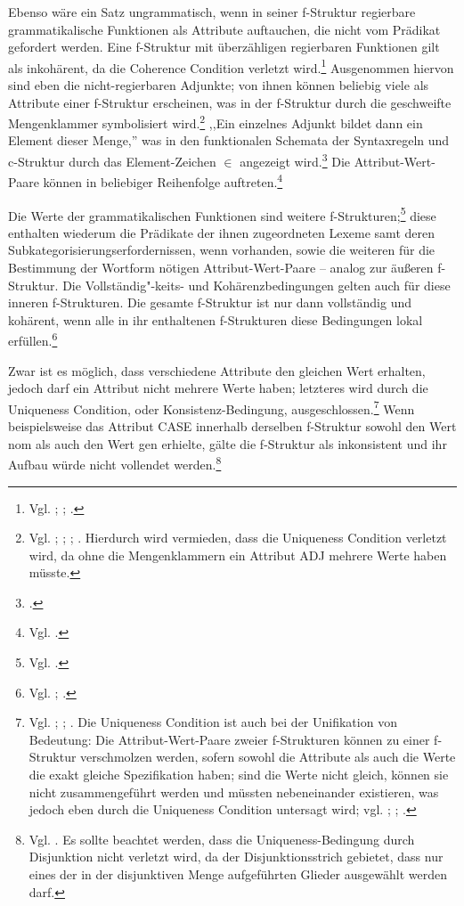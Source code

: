 \documentclass[12pt,a4paper]{article}
\begin{document}
Ebenso wäre ein Satz ungrammatisch, wenn in seiner f-Struktur regierbare grammatikalische Funktionen als Attribute auftauchen, die nicht vom Prädikat gefordert werden. Eine f-Struktur mit überzähligen regierbaren Funktionen gilt als inkohärent, da die Coherence Condition verletzt wird.\footnote{Vgl. \cite[59-62]{Falk}; \cite[29; 39]{Rohrer}; \cite[20]{Skript}.} Ausgenommen hiervon sind eben die nicht-regierbaren Adjunkte; von ihnen können beliebig viele als Attribute einer f-Struktur erscheinen, was in der f-Struktur durch die geschweifte Mengenklammer symbolisiert wird.\footnote{Vgl. \cite[61; 72]{Falk}; \cite[12]{Dal}; \cite[28]{Rohrer}; \cite[38-40]{Skript}. Hierdurch wird vermieden, dass die Uniqueness Condition verletzt wird, da ohne die Mengenklammern ein Attribut ADJ mehrere Werte haben müsste.} ,,Ein einzelnes Adjunkt bildet dann ein Element dieser Menge,'' was in den funktionalen Schemata der Syntaxregeln und c-Struktur durch das Element-Zeichen $\in$ angezeigt wird.\footnote{ \cite[39]{Skript}.} Die Attribut-Wert-Paare können in beliebiger Reihenfolge auftreten.\footnote{Vgl. \cite[35]{Rohrer}.}

Die Werte der grammatikalischen Funktionen sind weitere f-Strukturen;\footnote{Vgl. \cite[35]{Rohrer}.} diese enthalten wiederum die Prädikate der ihnen zugeordneten Lexeme samt deren Subkategorisierungserfordernissen, wenn vorhanden, sowie die weiteren für die Bestimmung der Wortform nötigen Attribut-Wert-Paare -- analog zur äußeren f-Struktur. Die Vollständig"-keits- und Kohärenzbedingungen gelten auch für diese inneren f-Strukturen. Die gesamte f-Struktur ist nur dann vollständig und kohärent, wenn alle in ihr enthaltenen f-Strukturen diese Bedingungen lokal erfüllen.\footnote{Vgl. \cite[60]{Falk}; \cite[19-21]{Skript}.}

Zwar ist es möglich, dass verschiedene Attribute den gleichen Wert erhalten, jedoch darf ein Attribut nicht mehrere Werte haben; letzteres wird durch die Uniqueness Condition, oder Konsistenz-Bedingung, ausgeschlossen.\footnote{Vgl. \cite[62]{Falk}; \cite[29]{Rohrer}; \cite[18-9]{Skript}. Die Uniqueness Condition ist auch bei der Unifikation von Bedeutung: Die Attribut-Wert-Paare zweier f-Strukturen können zu einer f-Struktur verschmolzen werden, sofern sowohl die Attribute als auch die Werte die exakt gleiche Spezifikation haben; sind die Werte nicht gleich, können sie nicht zusammengeführt werden und müssten nebeneinander existieren, was jedoch eben durch die Uniqueness Condition untersagt wird; vgl. \cite[68]{Falk}; \cite[37]{Rohrer}; \cite[18-9]{Skript}.} Wenn beispielsweise das Attribut CASE innerhalb derselben f-Struktur sowohl den Wert nom als auch den Wert gen erhielte, gälte die f-Struktur als inkonsistent und ihr Aufbau würde nicht vollendet werden.\footnote{Vgl. \cite[29; 35]{Rohrer}. Es sollte beachtet werden, dass die Uniqueness-Bedingung durch Disjunktion nicht verletzt wird, da der Disjunktionsstrich gebietet, dass nur eines der in der disjunktiven Menge aufgeführten Glieder ausgewählt werden darf.} 
\end{document}
